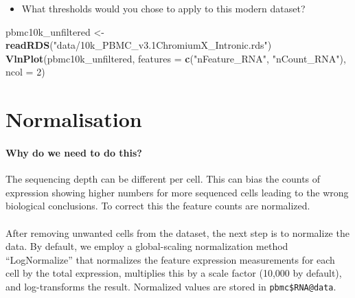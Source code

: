 \documentclass[
]{book}
\newenvironment{Shaded}{\begin{snugshade}}{\end{snugshade}}
\newcommand{\AttributeTok}[1]{\textcolor[rgb]{0.13,0.29,0.53}{#1}}
\newcommand{\DecValTok}[1]{\textcolor[rgb]{0.00,0.00,0.81}{#1}}
\newcommand{\FunctionTok}[1]{\textcolor[rgb]{0.13,0.29,0.53}{\textbf{#1}}}
\newcommand{\NormalTok}[1]{#1}
\newcommand{\OtherTok}[1]{\textcolor[rgb]{0.56,0.35,0.01}{#1}}
\newcommand{\StringTok}[1]{\textcolor[rgb]{0.31,0.60,0.02}{#1}}
\providecommand{\tightlist}{%
  \setlength{\itemsep}{0pt}\setlength{\parskip}{0pt}}
\begin{document}
\begin{itemize}
\tightlist
\item
  What thresholds would you chose to apply to this modern dataset?
\end{itemize}

\begin{Shaded}
\begin{Highlighting}[]
\NormalTok{pbmc10k\_unfiltered }\OtherTok{\textless{}{-}} \FunctionTok{readRDS}\NormalTok{(}\StringTok{"data/10k\_PBMC\_v3.1ChromiumX\_Intronic.rds"}\NormalTok{)}
\FunctionTok{VlnPlot}\NormalTok{(pbmc10k\_unfiltered, }\AttributeTok{features =} \FunctionTok{c}\NormalTok{(}\StringTok{"nFeature\_RNA"}\NormalTok{, }\StringTok{"nCount\_RNA"}\NormalTok{), }\AttributeTok{ncol =} \DecValTok{2}\NormalTok{)}
\end{Highlighting}
\end{Shaded}

\hypertarget{norm}{%
\chapter{Normalisation}\label{norm}}

\hypertarget{why-do-we-need-to-do-this-1}{%
\subsubsection*{Why do we need to do this?}\label{why-do-we-need-to-do-this-1}}

The sequencing depth can be different per cell. This can bias the counts of expression showing higher numbers for more sequenced cells leading to the wrong biological conclusions. To correct this the feature counts are normalized.

\hypertarget{section-3}{%
\subsubsection*{}\label{section-3}}

After removing unwanted cells from the dataset, the next step is to normalize the data. By default, we employ a global-scaling normalization method ``LogNormalize'' that normalizes the feature expression measurements for each cell by the total expression, multiplies this by a scale factor (10,000 by default), and log-transforms the result. Normalized values are stored in \texttt{pbmc\$RNA@data}.
\end{document}
